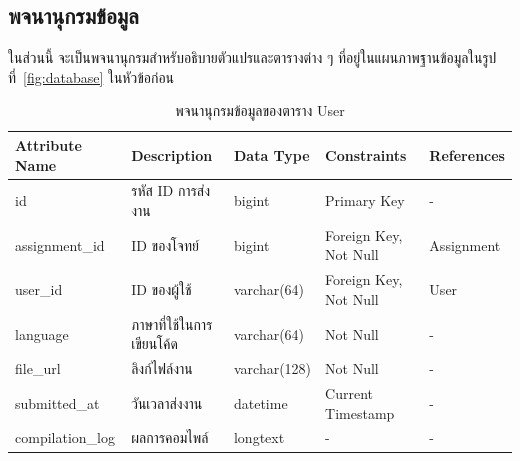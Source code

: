 \documentclass[12pt,one side,openright,a4paper]{cpe-thesis-th}
\begin{document}
    \subsection{พจนานุกรมข้อมูล}
    ในส่วนนี้ จะเป็นพจนานุกรมสำหรับอธิบายตัวแปรและตารางต่าง ๆ ที่อยู่ในแผนภาพฐานข้อมูลในรูปที่~\ref{fig:database} ในหัวข้อก่อน
    \begin{table}[!h]
        \centering
        \caption{พจนานุกรมข้อมูลของตาราง User}\label{tbl:data-dict-user}
        \begin{tabular}{p{2cm}|p{4cm}p{2cm}p{3cm}p{2cm}} \hline\hline
            Attribute Name & Description & Data Type & Constraints & References \\ \hline\hline
            id & รหัส ID การส่งงาน & bigint & Primary Key & - \\
            assignment\_id & ID ของโจทย์ & bigint & Foreign Key, Not Null & Assignment \\
            user\_id & ID ของผู้ใช้ & varchar(64) & Foreign Key, Not Null & User \\
            language & ภาษาที่ใช้ในการเขียนโค้ด & varchar(64) & Not Null & - \\
            file\_url & ลิงก์ไฟล์งาน & varchar(128) & Not Null & - \\
            submitted\_at & วันเวลาส่งงาน & datetime & Current Timestamp & - \\
            compilation\_log & ผลการคอมไพล์ & longtext & - & - \\ \hline\hline
        \end{tabular}   
    \end{table}
\end{document}
